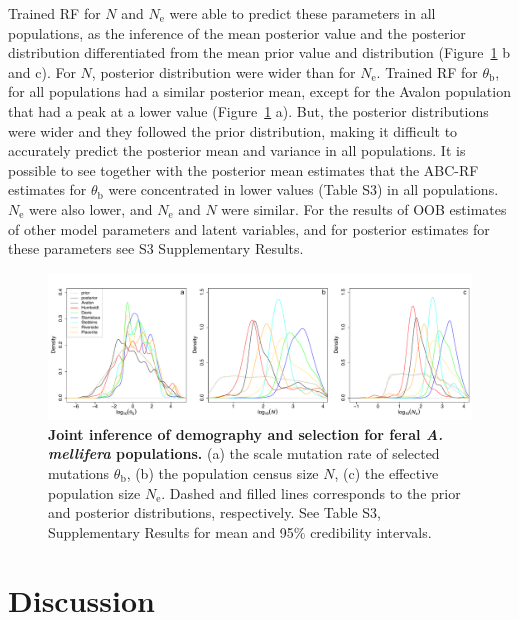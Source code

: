 \documentclass[a4paper, 12pt]{article}
\begin{document}
Trained RF for $N$ and $N_{\mathrm{e}}$ were able to predict these parameters in all populations, as the inference of the mean posterior value and the posterior distribution differentiated from the mean prior value and distribution (Figure~\ref{fig:postBees_jointdemosel} b and c). For $N$, posterior distribution were wider  than for $N_{\mathrm{e}}$. Trained RF for $\theta_{\mathrm{b}}$, for all populations had a similar posterior mean, except for the Avalon population that had a peak at a lower value (Figure~\ref{fig:postBees_jointdemosel} a). But, the posterior distributions were wider and they followed the prior distribution, making it difficult to accurately predict the posterior mean and variance in all populations. It is possible to see together with the posterior mean estimates that the ABC-RF estimates for $\theta_{\mathrm{b}}$ were concentrated in lower values (Table S3) in all populations. $N_{\mathrm{e}}$ were also lower, and $N_{\mathrm{e}}$ and $N$ were similar. For the results of OOB estimates of other model parameters and latent variables, and for posterior estimates for these parameters see S3 Supplementary Results.


\begin{figure}[htb]
  \centering
  \includegraphics[width=1\textwidth]{Figures/Figure4_weighted_densityPlots_jointDemoSel_feralbees.pdf}
  \small\caption{\textbf{Joint inference of demography and selection for feral \textit{A. mellifera} populations.} (a) the scale mutation rate of selected mutations $\theta_{\mathrm{b}}$, (b) the population census size $N$, (c) the effective population size $N_{\mathrm{e}}$. Dashed and filled lines corresponds to the prior and posterior distributions, respectively. See Table S3, Supplementary Results for mean and 95\% credibility intervals.}
  \label{fig:postBees_jointdemosel}
\end{figure}

\section*{Discussion}
\end{document}
